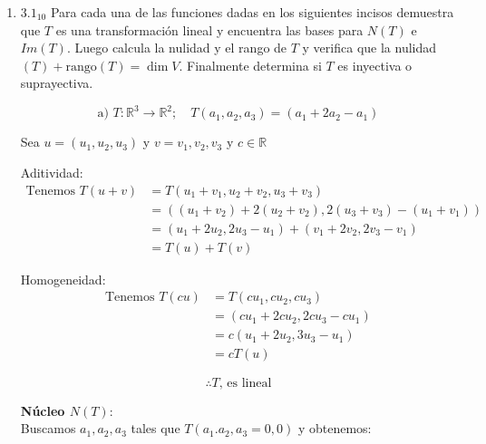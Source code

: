 \documentclass{article}
\begin{document}
		\begin{enumerate}
			
			
			\item[] \(3.1_{10}\) Para cada una de las funciones dadas en los siguientes incisos demuestra que \(T\) es una transformación lineal y encuentra las bases para \(N(T)\) e \(Im(T)\). Luego calcula la nulidad y el rango de \(T\) y verifica que la nulidad\((T)+\text{rango}(T)=\dim V\). Finalmente determina si \(T\) es inyectiva o suprayectiva.
			
			\begin{equation*}
				\text{a) } T:\mathbb{R}^3\to\mathbb{R}^2; \quad T(a_1,a_2,a_3) = (a_1+2a_2 - a_1)
			\end{equation*}
			
			Sea \(u=(u_1,u_2,u_3)\) y \(v=v_1,v_2,v_3\) y \(c \in \mathbb{R}\)
			
			Aditividad:\\
			\begin{equation*}
				\begin{aligned}
					\text{Tenemos } T(u+v) &=T(u_1+v_1,u_2+v_2,u_3+v_3) \\
										   &=((u_1+v_2) +2(u_2+v_2), 2(u_3+v_3) -(u_1+v_1)) \\
										   &=(u_1+2u_2,2u_3-u_1)+(v_1+2v_2,2v_3-v_1) \\
										   &=T(u)+T(v)
				\end{aligned}
			\end{equation*}
			
			Homogeneidad: \\
			\begin{equation*}
				\begin{aligned}
					\text{Tenemos } T(cu) &=T(cu_1,cu_2,cu_3) \\
										  &=(cu_1+2cu_2,2cu_3-cu_1) \\
										  &=c(u_1+2u_2,3u_3-u_1) \\
										  &=cT(u)
				\end{aligned}
			\end{equation*}
			
			\begin{equation*}
				\boxed{\therefore T \text{, es lineal}}
			\end{equation*}
			
			\textbf{Núcleo \(N(T):\)} \\
			
			Buscamos \(a_1,a_2,a_3\) tales que \(T(a_1.a_2,a_3=0,0) \) y obtenemos:
			

\end{enumerate}
\end{document}
